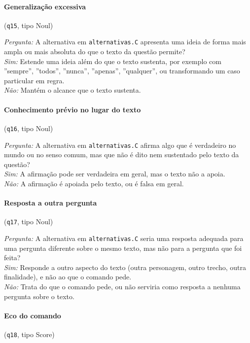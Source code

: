 \paragraph{Generalização excessiva} (\texttt{q15}, tipo Noul)

\textit{Pergunta:} A alternativa em \texttt{alternativas.C} apresenta uma ideia de forma mais ampla ou mais absoluta do que o texto da questão permite?\\
\textit{Sim:} Estende uma ideia além do que o texto sustenta, por exemplo com ''sempre'', ''todos'', ''nunca'', ''apenas'', ''qualquer'', ou transformando um caso particular em regra.\\
\textit{Não:} Mantém o alcance que o texto sustenta.

\paragraph{Conhecimento prévio no lugar do texto} (\texttt{q16}, tipo Noul)

\textit{Pergunta:} A alternativa em \texttt{alternativas.C} afirma algo que é verdadeiro no mundo ou no senso comum, mas que não é dito nem sustentado pelo texto da questão?\\
\textit{Sim:} A afirmação pode ser verdadeira em geral, mas o texto não a apoia.\\
\textit{Não:} A afirmação é apoiada pelo texto, ou é falsa em geral.

\paragraph{Resposta a outra pergunta} (\texttt{q17}, tipo Noul)

\textit{Pergunta:} A alternativa em \texttt{alternativas.C} seria uma resposta adequada para uma pergunta diferente sobre o mesmo texto, mas não para a pergunta que foi feita?\\
\textit{Sim:} Responde a outro aspecto do texto (outra personagem, outro trecho, outra finalidade), e não ao que o comando pede.\\
\textit{Não:} Trata do que o comando pede, ou não serviria como resposta a nenhuma pergunta sobre o texto.

\paragraph{Eco do comando} (\texttt{q18}, tipo Score)

